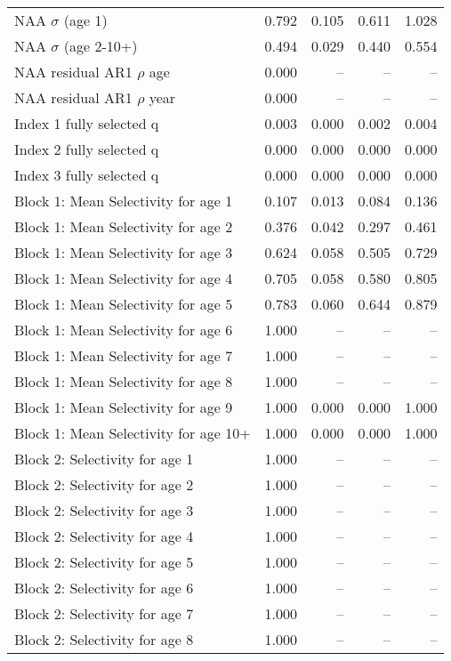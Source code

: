 \documentclass[
]{article}
\begin{document}
\begin{landscape}
\begin{longtable}[t]{lrrrr}
\endfoot
\bottomrule
\endlastfoot
NAA $\sigma$ (age 1) & 0.792 & 0.105 & 0.611 & 1.028\\
NAA $\sigma$ (age 2-10+) & 0.494 & 0.029 & 0.440 & 0.554\\
NAA residual AR1 $\rho$ age & 0.000 & -- & -- & --\\
NAA residual AR1 $\rho$ year & 0.000 & -- & -- & --\\
Index 1 fully selected q & 0.003 & 0.000 & 0.002 & 0.004\\
\addlinespace
Index 2 fully selected q & 0.000 & 0.000 & 0.000 & 0.000\\
Index 3 fully selected q & 0.000 & 0.000 & 0.000 & 0.000\\
Block 1: Mean Selectivity for age 1 & 0.107 & 0.013 & 0.084 & 0.136\\
Block 1: Mean Selectivity for age 2 & 0.376 & 0.042 & 0.297 & 0.461\\
Block 1: Mean Selectivity for age 3 & 0.624 & 0.058 & 0.505 & 0.729\\
\addlinespace
Block 1: Mean Selectivity for age 4 & 0.705 & 0.058 & 0.580 & 0.805\\
Block 1: Mean Selectivity for age 5 & 0.783 & 0.060 & 0.644 & 0.879\\
Block 1: Mean Selectivity for age 6 & 1.000 & -- & -- & --\\
Block 1: Mean Selectivity for age 7 & 1.000 & -- & -- & --\\
Block 1: Mean Selectivity for age 8 & 1.000 & -- & -- & --\\
\addlinespace
Block 1: Mean Selectivity for age 9 & 1.000 & 0.000 & 0.000 & 1.000\\
Block 1: Mean Selectivity for age 10+ & 1.000 & 0.000 & 0.000 & 1.000\\
Block 2: Selectivity for age 1 & 1.000 & -- & -- & --\\
Block 2: Selectivity for age 2 & 1.000 & -- & -- & --\\
Block 2: Selectivity for age 3 & 1.000 & -- & -- & --\\
\addlinespace
Block 2: Selectivity for age 4 & 1.000 & -- & -- & --\\
Block 2: Selectivity for age 5 & 1.000 & -- & -- & --\\
Block 2: Selectivity for age 6 & 1.000 & -- & -- & --\\
Block 2: Selectivity for age 7 & 1.000 & -- & -- & --\\
Block 2: Selectivity for age 8 & 1.000 & -- & -- & --\\

\end{longtable}
\end{landscape}
\end{document}
